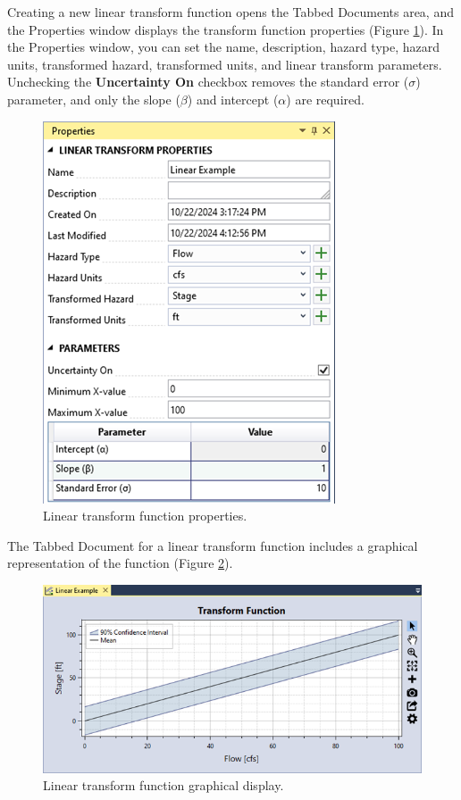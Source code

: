 \documentclass[
]{book}
\begin{document}
Creating a new linear transform function opens the Tabbed Documents area, and the Properties window displays the transform function properties (Figure \ref{fig:figure-75}). In the Properties window, you can set the name, description, hazard type, hazard units, transformed hazard, transformed units, and linear transform parameters. Unchecking the \textbf{Uncertainty On} checkbox removes the standard error (\(\sigma\)) parameter, and only the slope (\(\beta\)) and intercept (\(\alpha\)) are required.

\begin{figure}

{\centering \includegraphics{images/figure75} 

}

\caption{Linear transform function properties.}\label{fig:figure-75}
\end{figure}

The Tabbed Document for a linear transform function includes a graphical representation of the function (Figure \ref{fig:figure-76}).

\begin{figure}

{\centering \includegraphics{images/figure76} 

}

\caption{Linear transform function graphical display.}\label{fig:figure-76}
\end{figure}
\end{document}
